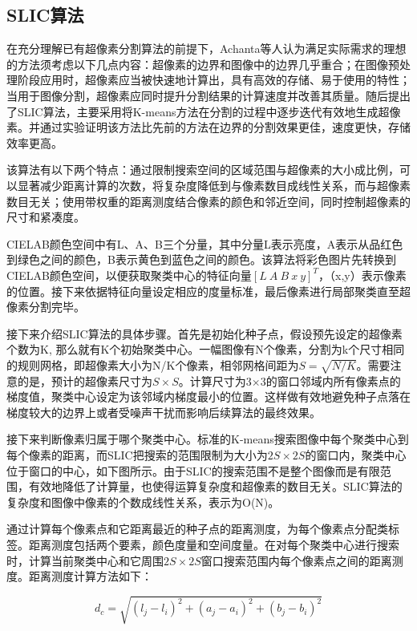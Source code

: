 \documentclass[nomlist,masters]{seuthesix}
\begin{document}
\subsection{SLIC算法}
在充分理解已有超像素分割算法的前提下，Achanta等人\cite{Achanta2012SLIC}认为满足实际需求的理想的方法须考虑以下几点内容：超像素的边界和图像中的边界几乎重合；在图像预处理阶段应用时，超像素应当被快速地计算出，具有高效的存储、易于使用的特性；当用于图像分割，超像素应同时提升分割结果的计算速度并改善其质量。随后提出了SLIC算法，主要采用将K-means方法在分割的过程中逐步迭代有效地生成超像素。并通过实验证明该方法比先前的方法在边界的分割效果更佳，速度更快，存储效率更高。

该算法有以下两个特点：通过限制搜索空间的区域范围与超像素的大小成比例，可以显著减少距离计算的次数，将复杂度降低到与像素数目成线性关系，而与超像素数目无关；使用带权重的距离测度结合像素的颜色和邻近空间，同时控制超像素的尺寸和紧凑度。

CIELAB颜色空间中有L、A、B三个分量，其中分量L表示亮度，A表示从品红色到绿色之间的颜色，B表示黄色到蓝色之间的颜色。该算法将彩色图片先转换到CIELAB颜色空间，以便获取聚类中心的特征向量$\left [ L\ A\ B\ x\ y \right ]^{T} $，（x,y）表示像素的位置。接下来依据特征向量设定相应的度量标准，最后像素进行局部聚类直至超像素分割完毕。

接下来介绍SLIC算法的具体步骤。首先是初始化种子点，假设预先设定的超像素个数为K, 那么就有K个初始聚类中心。一幅图像有N个像素，分割为k个尺寸相同的规则网格，即超像素大小为N/K个像素，相邻网格间距为$S=\sqrt{N/K}$。需要注意的是，预计的超像素尺寸为$S\times S$。计算尺寸为3$\times$3的窗口邻域内所有像素点的梯度值，聚类中心设定为该邻域内梯度最小的位置。这样做有效地避免种子点落在梯度较大的边界上或者受噪声干扰而影响后续算法的最终效果。

接下来判断像素归属于哪个聚类中心。标准的K-means搜索图像中每个聚类中心到每个像素的距离，而SLIC把搜索的范围限制为大小为$2S\times 2S$的窗口内，聚类中心位于窗口的中心，如下图所示。由于SLIC的搜索范围不是整个图像而是有限范围，有效地降低了计算量，也使得运算复杂度和超像素的数目无关。SLIC算法的复杂度和图像中像素的个数成线性关系，表示为O(N)。

通过计算每个像素点和它距离最近的种子点的距离测度，为每个像素点分配类标签。距离测度包括两个要素，颜色度量和空间度量。在对每个聚类中心进行搜索时，计算当前聚类中心和它周围$2S\times 2S$窗口搜索范围内每个像素点之间的距离测度。距离测度计算方法如下：

\begin{equation}
d_{c}=\sqrt{(l_{j}-l_{i})^{2}+(a_{j}-a_{i})^{2}+(b_{j}-b_{i})^{2}}
\label{SLICdc}
\end{equation}
\end{document}
